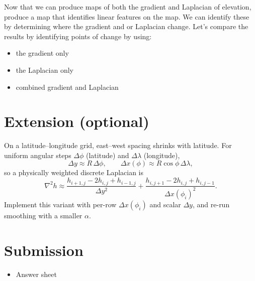\documentclass[final,a4paper,12pt]{article}
\begin{document}
\begin{questions}[resume]

  Now that we can produce maps of both the gradient and Laplacian of elevation, produce a map that identifies linear features on the map.  We can identify these by determining where the gradient and or Laplacian change.  Let's compare the results by identifying points of change by using:
  \begin{itemize}
    \item the gradient only
    \item the Laplacian only
    \item combined gradient and Laplacian
  \end{itemize}

\end{questions}

\section*{Extension (optional)}
On a latitude--longitude grid, east--west spacing shrinks with latitude. For uniform angular steps $\Delta\phi$ (latitude) and $\Delta\lambda$ (longitude),
\[
  \Delta y \approx R\,\Delta\phi,\qquad \Delta x(\phi) \approx R\cos\phi\,\Delta\lambda,
\]
so a physically weighted discrete Laplacian is
\[
  \nabla^2 h \approx \frac{h_{i+1,j}-2h_{i,j}+h_{i-1,j}}{\Delta y^{2}}
  + \frac{h_{i,j+1}-2h_{i,j}+h_{i,j-1}}{\Delta x(\phi_i)^{2}}.
\]
Implement this variant with per-row $\Delta x(\phi_i)$ and scalar $\Delta y$, and re-run smoothing with a smaller $\alpha$.

\section*{Submission}
\begin{itemize}
  \item Answer sheet
\end{itemize}
\end{document}
